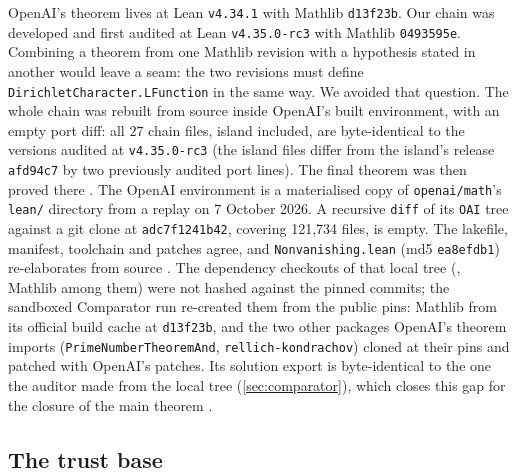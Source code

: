 \documentclass[11pt]{article}
\theoremstyle{definition}
\newcommand{\lean}[1]{\texttt{#1}}
\begin{document}
OpenAI's theorem lives at Lean \lean{v4.34.1} with Mathlib \lean{d13f23b}. Our chain was developed and first audited at Lean \lean{v4.35.0-rc3} with Mathlib \lean{0493595e}. Combining a theorem from one Mathlib revision with a hypothesis stated in another would leave a seam: the two revisions must define \lean{DirichletCharacter.\allowbreak{}LFunction} in the same way. We avoided that question. The whole chain was rebuilt from source inside OpenAI's built environment, with an empty port diff: all $27$ chain files, island included, are byte-identical to the versions audited at \lean{v4.35.0-rc3} (the island files differ from the island's release \lean{afd94c7} by two previously audited port lines). The final theorem was then proved there \cite[REVIEW\_GAUSS\_SIGN\_AND\_OAI \S B.1; ADD1 \S3]{bbrecords}. The OpenAI environment is a materialised copy of \lean{openai/\allowbreak{}math}'s \lean{lean/\allowbreak{}} directory from a replay on 7 October 2026. A recursive \lean{diff} of its \lean{OAI} tree against a git clone at \lean{adc7f1241b42}, covering 121,734 files, is empty. The lakefile, manifest, toolchain and patches agree, and \lean{Nonvanishing.lean} (md5 \lean{ea8efdb1}) re-elaborates from source \cite[REPORT\_OAI\_PORT (b)]{bbrecords}. The dependency checkouts of that local tree (, Mathlib among them) were not hashed against the pinned commits; the sandboxed Comparator run re-created them from the public pins: Mathlib from its official build cache at \lean{d13f23b}, and the two other packages OpenAI's theorem imports (\lean{PrimeNumberTheoremAnd}, \lean{rellich-kondrachov}) cloned at their pins and patched with OpenAI's patches. Its solution export is byte-identical to the one the auditor made from the local tree (\cref{sec:comparator}), which closes this gap for the closure of the main theorem \cite[REVIEW\_COMPARATOR\_LAMBDA\_CHI \S4]{bbrecords}.

\subsection{The trust base}\label{sec:trust}
\end{document}
